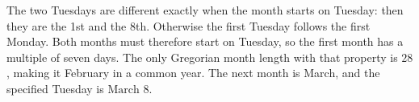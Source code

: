 The two Tuesdays are different exactly when the month starts on Tuesday: then they are the 1st and the 8th. Otherwise the first Tuesday follows the first Monday. Both months must therefore start on Tuesday, so the first month has a multiple of seven days. The only Gregorian month length with that property is $28$, making it February in a common year. The next month is March, and the specified Tuesday is $\boxed{\text{March 8}}$.
